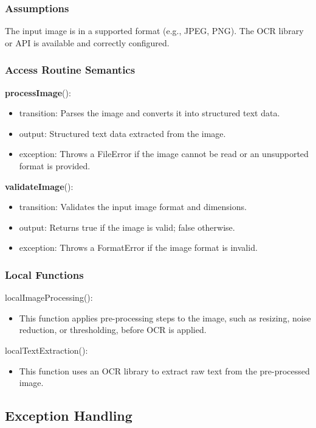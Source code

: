 \documentclass[12pt, titlepage]{article}
\begin{document}
\subsubsection{Assumptions}

The input image is in a supported format (e.g., JPEG, PNG). The OCR library or API is available and correctly configured.

\subsubsection{Access Routine Semantics}

\noindent \textbf{processImage}():
\begin{itemize}
\item transition: Parses the image and converts it into structured text data.
\item output: Structured text data extracted from the image.
\item exception: Throws a FileError if the image cannot be read or an unsupported format is provided.
\end{itemize}

\noindent \textbf{validateImage}():
\begin{itemize}
\item transition: Validates the input image format and dimensions.
\item output: Returns true if the image is valid; false otherwise.
\item exception: Throws a FormatError if the image format is invalid.
\end{itemize}

\subsubsection{Local Functions}

localImageProcessing():
\begin{itemize}
\item This function applies pre-processing steps to the image, such as resizing, noise reduction, or thresholding, before OCR is applied.
\end{itemize}

localTextExtraction():
\begin{itemize}
\item This function uses an OCR library to extract raw text from the pre-processed image.
\end{itemize}

\subsection{Exception Handling}
\end{document}
